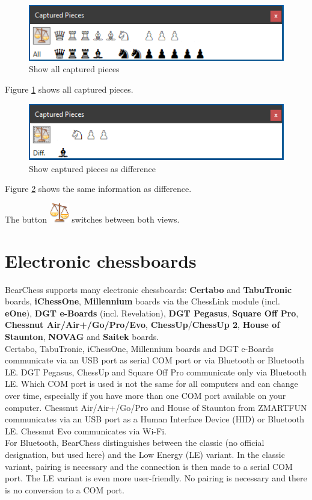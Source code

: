 \documentclass[11pt,a4paper]{article}
\begin{document}
	\begin{figure}[H]
		\centering
		\includegraphics[scale=1.0]{CapturedPieces3.png}
		\caption{Show all captured pieces }
		\label{fig:CapturedPieces3}
	\end{figure}
	
	Figure \ref{fig:CapturedPieces3} shows all captured pieces.
	
	\begin{figure}[H]
		\centering
		\includegraphics[scale=1.0]{CapturedPieces4.png}
		\caption{Show captured pieces as difference}
		\label{fig:CapturedPieces4}
	\end{figure}
	Figure \ref{fig:CapturedPieces4} shows the same information as difference.
	
	The button \includegraphics[scale=0.5]{balance_unbalance.png} switches between both views.
	
	
	\section{Electronic chessboards} \label{ElectronicChessBoard}
	BearChess supports many electronic chessboards: \textbf{Certabo} and \textbf{TabuTronic}  boards, \textbf{iChessOne}, \textbf{Millennium} boards via the ChessLink module (incl. \textbf{eOne}), \textbf{DGT e-Boards} (incl. Revelation), \textbf{DGT Pegasus}, \textbf{Square Off Pro},\\ \textbf{Chessnut Air/Air+/Go/Pro/Evo}, \textbf{ChessUp}/\textbf{ChessUp 2}, \textbf{House of Staunton}, \textbf{NOVAG} and \textbf{Saitek} boards.
	\\Certabo, TabuTronic, iChessOne, Millennium boards and DGT e-Boards communicate via an USB port as serial COM port or via Bluetooth or Bluetooth LE. DGT Pegasus, ChessUp and Square Off Pro communicate only via Bluetooth LE. Which COM port is used is not the same for all computers and can change over time, especially if you have more than one COM port available on your computer. Chessnut Air/Air+/Go/Pro and House of Staunton from ZMARTFUN communicates via an USB port as a Human Interface Device (HID) or Bluetooth LE. Chessnut Evo
	communicates via Wi-Fi.\\ 
	For Bluetooth, BearChess distinguishes between the classic (no official designation, but used here) and the Low Energy (LE) variant.
	In the classic variant, pairing is necessary and the connection is then made to a serial COM port. The LE variant is even more user-friendly. No pairing is necessary and there is no conversion to a COM port.
\end{document}
